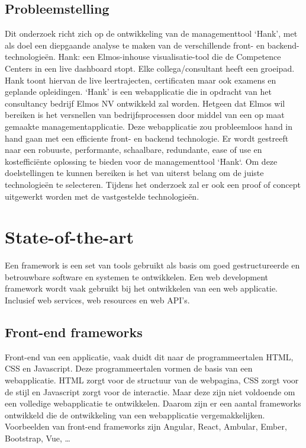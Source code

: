 \documentclass{hogent-article}
\begin{document}
  \subsection{Probleemstelling}%
  \label{sub:probleemstelling}
  Dit onderzoek richt zich op de ontwikkeling van de managementtool `Hank', met als doel een diepgaande analyse te maken van de verschillende front- en backend-technologieën. Hank: een Elmos-inhouse visualisatie-tool die de Competence Centers in een live dashboard stopt. Elke collega/consultant heeft een groeipad. Hank toont hiervan de live leertrajecten, certificaten maar ook examens en geplande opleidingen. `Hank' is een webapplicatie die in opdracht van het consultancy bedrijf Elmos NV ontwikkeld zal worden. Hetgeen dat Elmos wil bereiken is het versnellen van bedrijfsprocessen door middel van een op maat gemaakte managementapplicatie. Deze webapplicatie zou probleemloos hand in hand gaan met een efficiente front- en backend technologie.
  \bigskip
  Er wordt gestreeft naar een robuuste, performante, schaalbare, redundante, ease of use en kostefficiënte oplossing te bieden voor de managementtool `Hank`. Om deze doelstellingen te kunnen bereiken is het van uiterst belang om de juiste technologieën te selecteren. Tijdens het onderzoek zal er ook een proof of concept uitgewerkt worden met de vastgestelde technologieën.


\section{State-of-the-art}%
\label{sec:state-of-the-art}

Een framework is een set van tools gebruikt als basis om goed gestructureerde en betrouwbare software en systemen te ontwikkelen. Een web development framework wordt vaak gebruikt bij het ontwikkelen van een web applicatie. Inclusief web services, web resources en web API's.

\subsection{Front-end frameworks}%
\label{sub:frontend_frameworks}
Front-end van een applicatie, vaak duidt dit naar de programmeertalen HTML, CSS en Javascript. Deze programmeertalen vormen de basis van een webapplicatie. HTML zorgt voor de structuur van de webpagina, CSS zorgt voor de stijl en Javascript zorgt voor de interactie. Maar deze zijn niet voldoende om een volledige webapplicatie te ontwikkelen. Daarom zijn er een aantal frameworks ontwikkeld die de ontwikkeling van een webapplicatie vergemakkelijken. 
Voorbeelden van front-end frameworks zijn Angular, React, Ambular, Ember, Bootstrap, Vue, \ldots\textcite{Jaiswal2022} 
\end{document}
